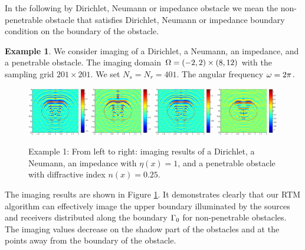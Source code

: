 \documentclass[12pt]{iopart}
\begin{document}
{In the following by Dirichlet, Neumann or impedance obstacle we mean the non-penetrable obstacle that
satisfies Dirichlet, Neumann or impedance boundary condition on the boundary of the obstacle.

\bigskip
\textbf{Example 1}.
We consider imaging of a Dirichlet, a Neumann, an impedance, and a penetrable obstacle. The imaging domain $\Omega=(-2,2) \times (8, 12)$ with the sampling grid $201 \times 201$. We set $N_s = N_r = 401$. The angular frequency $\omega=2\pi$.
 \begin{figure}
 	\centering
 	\includegraphics[width=0.24\textwidth]{./graphic/peanut_3pi.eps}
 	\includegraphics[width=0.24\textwidth]{./graphic/peanut_3pi_neumann.eps}
 	\includegraphics[width=0.24\textwidth]{./graphic/peanut_3pi_impedance_1.eps}
 	\includegraphics[width=0.24\textwidth]{./graphic/peanut_3pi_transmission.eps}
 	\caption{Example 1: From left to right: imaging results of a Dirichlet, a Neumann, an impedance with $\eta(x)=1$, and a penetrable obstacle with diffractive index $n(x)=0.25$.} \label{figure_1}
 \end{figure}
 
 The imaging results are shown in Figure \ref{figure_1}. It demonstrates clearly that our RTM
 algorithm can effectively image the upper boundary illuminated by the sources and
 receivers distributed along the boundary $\Gamma_0$ for non-penetrable obstacles. The imaging
 values decrease on the shadow part of the obstacles and at the points away from the
 boundary of the obstacle.

}
\end{document}
